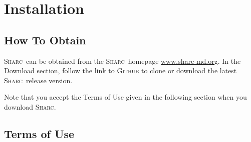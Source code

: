 \documentclass[a4paper,10pt,DIV=15,openany]{scrbook}
\newcommand{\link}[2]{\href{#1}{#2}}
\newcommand{\sharc}{\textsc{Sharc}}
\newcommand{\todo}[1]{\textcolor{RL}{#1}}
\begin{document}

\chapter{Installation}

\section{How To Obtain}

\sharc\ can be obtained from the \sharc\ homepage \link{http://sharc-md.org}{www.sharc-md.org}. In the Download section, follow the link to \textsc{Github} to clone or download the latest \sharc\ release version.

Note that you accept the Terms of Use given in the following section when you download \sharc.

\section{Terms of Use}
\end{document}

